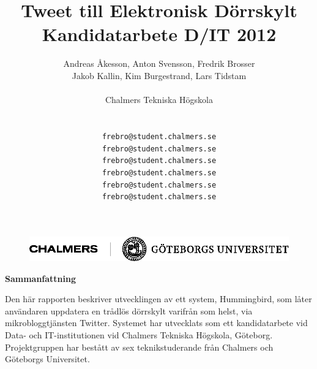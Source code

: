 \documentclass[a4paper,11pt]{article}
\begin{document}
\title{
{\huge Tweet till Elektronisk Dörrskylt} \\
	Kandidatarbete D/IT 2012 \\}
	
\author{Andreas Åkesson, Anton Svensson, Fredrik Brosser \\ Jakob Kallin, Kim Burgestrand, Lars Tidstam \\ \\
   	Chalmers Tekniska Högskola \\ \\
	\begin{tabular}{l c r}
		\texttt{frebro} & \texttt{@} & \texttt{student.chalmers.se}\\
		\texttt{frebro} & \texttt{@} & \texttt{student.chalmers.se}\\
		\texttt{frebro} & \texttt{@} & \texttt{student.chalmers.se}\\
		\texttt{frebro} & \texttt{@} & \texttt{student.chalmers.se}\\
		\texttt{frebro} & \texttt{@} & \texttt{student.chalmers.se}\\
		\texttt{frebro} & \texttt{@} & \texttt{student.chalmers.se}\\
	\end{tabular}
	}
	
\maketitle
\begin{figure}[H]
\includegraphics[scale=0.75, angle=0]{ChaGUsvart.png}
\label{fig:titel_img}
\end{figure}

\thispagestyle{empty}
\pagebreak

\thispagestyle{empty}
\begin{center}
{\noindent \bf Sammanfattning}\\
\end{center}

Den här rapporten beskriver utvecklingen av ett system, Hummingbird, som låter användaren uppdatera en trådlös dörrskylt varifrån som helst, via mikrobloggtjänsten Twitter. Systemet har utvecklats som ett kandidatarbete vid Data- och IT-institutionen vid Chalmers Tekniska Högskola, Göteborg. Projektgruppen har bestått av sex teknikstuderande från Chalmers och Göteborgs Universitet. \\
\end{document}
